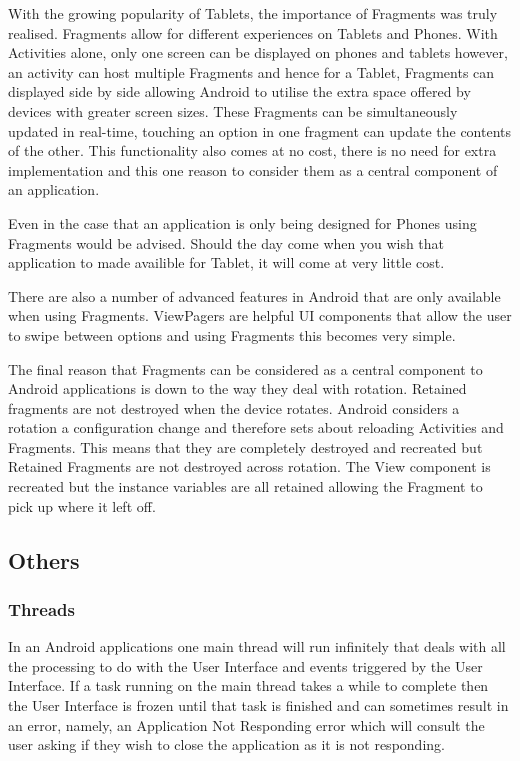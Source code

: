 \documentclass{l4proj}
\begin{document}
With the growing popularity of Tablets, the importance of Fragments was truly realised.  Fragments allow for different experiences on Tablets and Phones. With Activities alone, only one screen can be displayed on phones and tablets however, an activity can host multiple Fragments and hence for a Tablet, Fragments can displayed side by side allowing Android to utilise the extra space offered by devices with greater screen sizes. These Fragments can be simultaneously updated in real-time, touching an option in one fragment can update the contents of the other. This functionality also comes at no cost, there is no need for extra implementation and this one reason to consider them as a central component of an application. 

Even in the case that an application is only being designed for Phones using Fragments would be advised.  Should the day come when you wish that application to made availible for Tablet, it will come at very little cost. 

There are also a number of advanced features in Android that are only available when using Fragments. ViewPagers are helpful UI components that allow the user to swipe between options and using Fragments this becomes very simple.

The final reason that Fragments can be considered as a central component to Android applications is down to the way they deal with rotation. Retained fragments are not destroyed when the device rotates.  Android considers a rotation a configuration change and therefore sets about reloading Activities and Fragments.  This means that they are completely destroyed and recreated but Retained Fragments are not destroyed across rotation.  The View component is recreated but the instance variables are all retained allowing the Fragment to pick up where it left off.  

\subsection{Others}
\subsubsection{Threads}
In an Android applications one main thread will run infinitely that deals with all the processing to do with the User Interface and events triggered by the User Interface.  If a task running on the main thread takes a while to complete then the User Interface is frozen until that task is finished and can sometimes result in an error, namely, an Application Not Responding error which will consult the user asking if they wish to close the application as it is not responding. 
\end{document}
